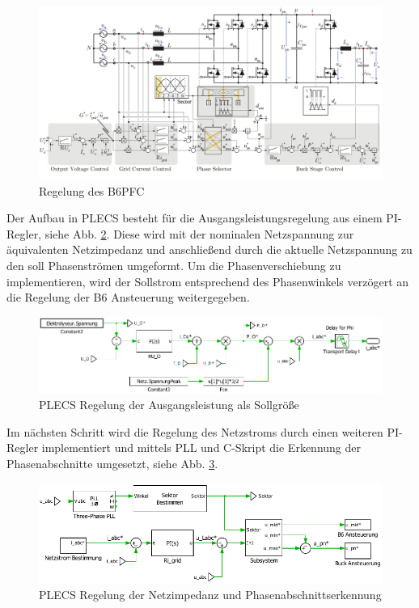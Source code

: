 			\begin{figure}[H]
			\centering
			\includegraphics[width=0.9\linewidth]{content/Grafiken/B6-Control-orig}
			\caption[Regelung des \gls{B6PFC}]{Regelung des \gls{B6PFC} \cite{13PWMPFC}}
			\label{fig:b6-control-orig}
			\end{figure}
			Der Aufbau in \gls{PLECS} besteht für die Ausgangsleistungsregelung aus einem PI-Regler, siehe Abb. \ref{fig:plecsb6controlpout}. Diese wird mit der nominalen Netzspannung zur äquivalenten Netzimpedanz und anschließend durch die aktuelle Netzspannung zu den soll Phasenströmen umgeformt. Um die Phasenverschiebung zu implementieren, wird der Sollstrom entsprechend des Phasenwinkels verzögert an die Regelung der B6 Ansteuerung weitergegeben.\\
				\begin{figure}[H]
				\centering
				\includegraphics[width=0.9\linewidth]{content/Grafiken/PLECS_B6_ControlPout}
				\caption{PLECS Regelung der Ausgangsleistung als Sollgröße}
				\label{fig:plecsb6controlpout}
			\end{figure}
			Im nächsten Schritt wird die Regelung des Netzstroms durch einen weiteren PI-Regler implementiert und mittels PLL und C-Skript die Erkennung der Phasenabschnitte umgesetzt, siehe Abb. \ref{fig:plecsb6controlrigrid}. 
				\begin{figure}[H]
				\centering
				\includegraphics[width=0.9\linewidth]{content/Grafiken/PLECS_B6_ControlRiGrid}
				\caption{PLECS Regelung der Netzimpedanz und Phasenabschnittserkennung}
				\label{fig:plecsb6controlrigrid}
			\end{figure}
